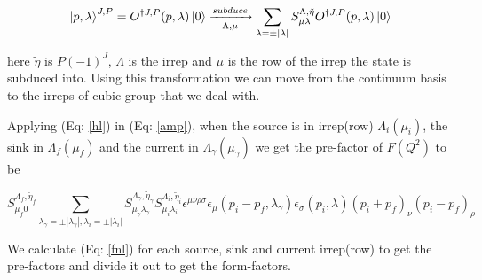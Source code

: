 \documentclass[10pt]{article}
\begin{document}
\begin{equation}
\label{hl}
\ket{p,\lambda}^{J,P} = O^{\dagger J,P}(p,\lambda)\ket{0} \xrightarrow[\Lambda, \mu]{subduce} \sum_{\lambda = \pm|\lambda| } S^{ \Lambda,\tilde{\eta}  }_{\mu\lambda} O^{\dagger J,P}(p,\lambda)\ket{0}
\end{equation}

here $\tilde{\eta}$ is $P(-1)^{J}$, $\Lambda$ is the irrep and $\mu$ is the row of the irrep the state is subduced into. Using this transformation we can move from the continuum basis to the irreps of cubic group that we deal with. \par
Applying (Eq: \ref{hl}) in (Eq: \ref{amp}), when the source is in irrep(row) $\Lambda_i (\mu_i) $, the sink in $\Lambda_f (\mu_f) $ and the current in $\Lambda_\gamma (\mu_\gamma) $ we get the pre-factor of $F(Q^2)$ to be

\begin{equation}
\label{fnl}
S^{ \Lambda_f,\tilde{\eta}_f  }_{\mu_f 0} \sum_{\lambda_{\gamma} = \pm|\lambda_{\gamma}| , \lambda_i = \pm|\lambda_i| } S^{ \Lambda_{\gamma},\tilde{\eta}_{\gamma}  }_{\mu_{\gamma} \lambda_{\gamma} } S^{ \Lambda_i,\tilde{\eta}_i  }_{\mu_i\lambda_i}\epsilon^{\mu\nu\rho\sigma}\epsilon_{\mu}(p_i - p_f, \lambda_{\gamma})\epsilon_{\sigma}(p_i, \lambda)(p_i + p_f)_{\nu}(p_i - p_f)_{\rho}
\end{equation}

We calculate (Eq: \ref{fnl}) for each source, sink and current irrep(row) to get the pre-factors and divide it out to get the form-factors.
\end{document}
